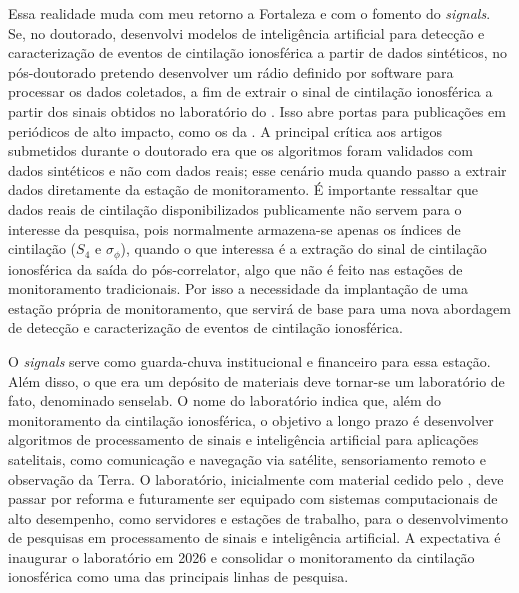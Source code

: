 \documentclass{article}
\begin{document}
Essa realidade muda com meu retorno a Fortaleza e com o fomento do  \textit{signals}. Se, no doutorado, desenvolvi modelos de inteligência artificial para detecção e caracterização de eventos de cintilação ionosférica a partir de dados sintéticos, no pós-doutorado pretendo desenvolver um rádio definido por software para processar os dados coletados, a fim de extrair o sinal de cintilação ionosférica a partir dos sinais  obtidos no laboratório do . Isso abre portas para publicações em periódicos de alto impacto, como os da . A principal crítica aos artigos submetidos durante o doutorado era que os algoritmos foram validados com dados sintéticos e não com dados reais; esse cenário muda quando passo a extrair dados diretamente da estação de monitoramento. É importante ressaltar que dados reais de cintilação disponibilizados publicamente não servem para o interesse da pesquisa, pois normalmente armazena-se apenas os índices de cintilação (\(S_4\) e \(\sigma_{\phi}\)), quando o que interessa é a extração do sinal de cintilação ionosférica da saída do pós-correlator, algo que não é feito nas estações de monitoramento tradicionais. Por isso a necessidade da implantação de uma estação própria de monitoramento, que servirá de base para uma nova abordagem de detecção e caracterização de eventos de cintilação ionosférica.

O  \textit{signals} serve como guarda-chuva institucional e financeiro para essa estação. Além disso, o que era um depósito de materiais deve tornar-se um laboratório de fato, denominado \gls{senselab}. O nome do laboratório indica que, além do monitoramento da cintilação ionosférica, o objetivo a longo prazo é desenvolver algoritmos de processamento de sinais e inteligência artificial para aplicações satelitais, como comunicação e navegação via satélite, sensoriamento remoto e observação da Terra. O laboratório, inicialmente com material cedido pelo , deve passar por reforma e futuramente ser equipado com sistemas computacionais de alto desempenho, como servidores e estações de trabalho, para o desenvolvimento de pesquisas em processamento de sinais e inteligência artificial. A expectativa é inaugurar o laboratório em 2026 e consolidar o monitoramento da cintilação ionosférica como uma das principais linhas de pesquisa.
\end{document}
